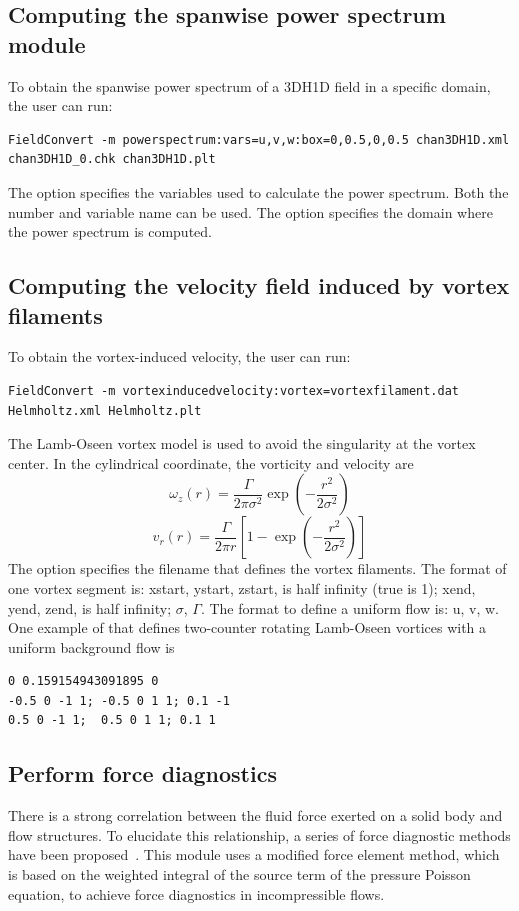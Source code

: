 \subsection{Computing the spanwise power spectrum module}
To obtain the spanwise power spectrum of a 3DH1D field in a specific domain, the user can run:
\begin{lstlisting}[style=BashInputStyle]
FieldConvert -m powerspectrum:vars=u,v,w:box=0,0.5,0,0.5 chan3DH1D.xml chan3DH1D_0.chk chan3DH1D.plt
\end{lstlisting}
The option  specifies the variables used to calculate the power spectrum. Both the number and variable name can be used. The option  specifies the domain where the power spectrum is computed.

\subsection{Computing the velocity field induced by vortex filaments}
To obtain the vortex-induced velocity, the user can run:
\begin{lstlisting}[style=BashInputStyle]
FieldConvert -m vortexinducedvelocity:vortex=vortexfilament.dat  Helmholtz.xml Helmholtz.plt
\end{lstlisting}
The Lamb-Oseen vortex model is used to avoid the singularity at the vortex center. In the cylindrical coordinate, the vorticity and velocity are
\[
\omega_z(r) = \frac{\Gamma}{2\pi\sigma^2}\exp\left(-\frac{r^2}{2\sigma^2}\right)
\]
\[
v_r(r) = \frac{\Gamma}{2\pi r}\left[1 - \exp\left(-\frac{r^2}{2\sigma^2}\right)\right]
\]
The option  specifies the filename that defines the vortex filaments. The format of one vortex segment is: xstart, ystart, zstart, is half infinity (true is 1); xend, yend, zend, is half infinity; $\sigma$, $\Gamma$. The format to define a uniform flow is: u, v, w.
One example of  that defines two-counter rotating Lamb-Oseen vortices with a uniform background flow  is
\begin{lstlisting}[style=C++Style]
0 0.159154943091895 0
-0.5 0 -1 1; -0.5 0 1 1; 0.1 -1
0.5 0 -1 1;  0.5 0 1 1; 0.1 1
\end{lstlisting}

\subsection{Perform force diagnostics}
There is a strong correlation between the fluid force exerted on a solid body and flow structures. To elucidate this relationship, a series of force diagnostic methods have been proposed~\cite{Gao2019Passing,Gao2019note,Gao2025Weighted}. This module uses a modified force element method, which is based on the weighted integral of the source term of the pressure Poisson equation, to achieve force diagnostics in incompressible flows.

